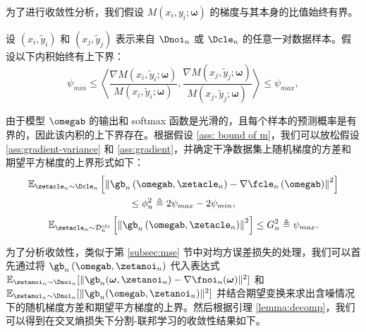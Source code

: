 为了进行收敛性分析，我们假设 $M(x_i, {y}_i; \boldsymbol{\omega})$ 的梯度与其本身的比值始终有界。
\begin{assumption}\label{ass: bound of m}
设 $\left(x_i,\tilde{y}_i\right)$ 和 $\left(x_j,\tilde{y}_j\right)$ 表示来自 $\Dnoi_n$ 或 $\Dcle_n$ 的任意一对数据样本。假设以下内积始终有上下界：
\begin{equation}
   \psi_{min} \leq \left\langle\frac{\nabla M(x_i, \tilde{y}_i; \boldsymbol{\omega})}{M(x_i, \tilde{y}_i; \boldsymbol{\omega})},\frac{\nabla M(x_j, \tilde{y}_j; \boldsymbol{\omega})}{M(x_j, \tilde{y}_j; \boldsymbol{\omega})}\right\rangle\leq \psi_{max},
\end{equation}
\end{assumption}

由于模型 $\omegab$ 的输出和 softmax 函数是光滑的，且每个样本的预测概率是有界的，因此该内积的上下界存在。根据假设 \ref{ass: bound of m}，我们可以放松假设 \ref{ass:gradient-variance} 和 \ref{ass:gradient}，并确定干净数据集上随机梯度的方差和期望平方梯度的上界形式如下：
\begin{multline}\label{eq:gradient-variance cross-entropy}
    \mathbb{E}_{\zetacle_n\sim \Dcle_n}\left[\left\Vert \gb_n\left(\omegab,\zetacle_n\right) - \nabla \fcle_n\left(\omegab\right) \right\Vert^2 \right] \\ \leq \phi^2_n \triangleq 2\psi_{max}-2\psi_{min},
\end{multline}
\begin{equation}\label{eq:gradient cross-entropy}
\mathbb{E}_{\zetacle_n\sim \mathcal{D}_n^{cle}}\left[\left\Vert \gb_n\left(\omegab, \zetacle_n\right) \right\Vert^2\right] \leq G_n^2 \triangleq  \psi_{max}.
\end{equation}

为了分析收敛性，类似于第 \ref{subsec:mse} 节中对均方误差损失的处理，我们可以首先通过将 $\gb_n\left(\omegab,\zetanoi_n\right)$ 代入表达式 $\mathbb{E}_{\zetanoi_n\sim \Dnoi_n}[\Vert \gb_n(\boldsymbol{\omega},\zetanoi_n) - \nabla \fnoi_n(\boldsymbol{\omega}) \Vert^2 ]$ 和 $\mathbb{E}_{\zetanoi_n\sim \Dnoi_n}[\Vert \gb_n(\omegab, \zetanoi_n) \Vert^2]$ 并结合期望变换来求出含噪情况下的随机梯度方差和期望平方梯度的上界。然后根据引理 \ref{lemma:decomp}，我们可以得到在交叉熵损失下分割-联邦学习的收敛性结果如下。

